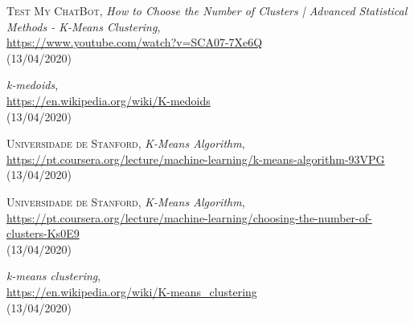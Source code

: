 \documentclass[12pt, a4paper, oneside]{scrreport}
\begin{document}
\begin{thebibliography}{9}
\textsc{Test My ChatBot},
{\em How to Choose the Number of Clusters | Advanced Statistical Methods - K-Means Clustering},
\\\url{https://www.youtube.com/watch?v=SCA07-7Xe6Q}
\\(13/04/2020)



{\em k-medoids},
\\\url{https://en.wikipedia.org/wiki/K-medoids}
\\(13/04/2020)

\textsc{Universidade de Stanford},
{\em K-Means Algorithm},
\\\url{
https://pt.coursera.org/lecture/machine-learning/k-means-algorithm-93VPG
}
\\(13/04/2020)


\textsc{Universidade de Stanford},
{\em K-Means Algorithm},
\\\url{
https://pt.coursera.org/lecture/machine-learning/choosing-the-number-of-clusters-Ks0E9
}
\\(13/04/2020)

{\em k-means clustering},
\\\url{https://en.wikipedia.org/wiki/K-means_clustering}
\\(13/04/2020)

\end{thebibliography}
\end{document}
